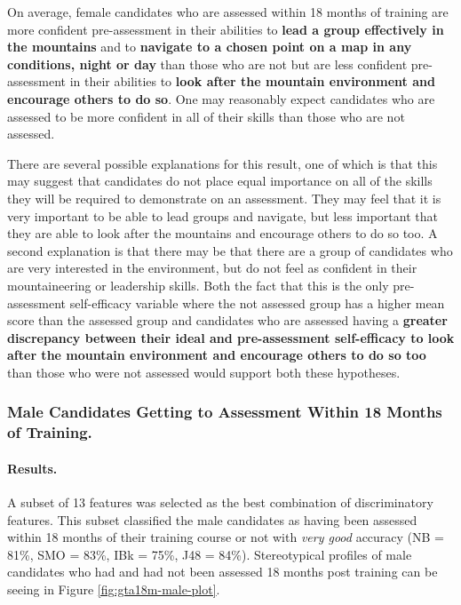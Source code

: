 \documentclass[
  12pt,
  a4paper,
]{book}
\begin{document}
On average, female candidates who are assessed within 18 months of training are more confident pre-assessment in their abilities to \textbf{lead a group effectively in the mountains} and to \textbf{navigate to a chosen point on a map in any conditions, night or day} than those who are not but are less confident pre-assessment in their abilities to \textbf{look after the mountain environment and encourage others to do so}. One may reasonably expect candidates who are assessed to be more confident in all of their skills than those who are not assessed.

There are several possible explanations for this result, one of which is that this may suggest that candidates do not place equal importance on all of the skills they will be required to demonstrate on an assessment. They may feel that it is very important to be able to lead groups and navigate, but less important that they are able to look after the mountains and encourage others to do so too. A second explanation is that there may be that there are a group of candidates who are very interested in the environment, but do not feel as confident in their mountaineering or leadership skills. Both the fact that this is the only pre-assessment self-efficacy variable where the not assessed group has a higher mean score than the assessed group and candidates who are assessed having a \textbf{greater discrepancy between their ideal and pre-assessment self-efficacy to look after the mountain environment and encourage others to do so too} than those who were not assessed would support both these hypotheses.

\hypertarget{mts-part-b-male-gta}{%
\subsubsection{Male Candidates Getting to Assessment Within 18 Months of Training.}\label{mts-part-b-male-gta}}

\hypertarget{mts-part-b-male-gta-results}{%
\paragraph{Results.}\label{mts-part-b-male-gta-results}}

A subset of 13 features was selected as the best combination of discriminatory features. This subset classified the male candidates as having been assessed within 18 months of their training course or not with \emph{very good} accuracy (NB = 81\%, SMO = 83\%, IBk = 75\%, J48 = 84\%). Stereotypical profiles of male candidates who had and had not been assessed 18 months post training can be seeing in Figure \ref{fig:gta18m-male-plot}.
\end{document}
